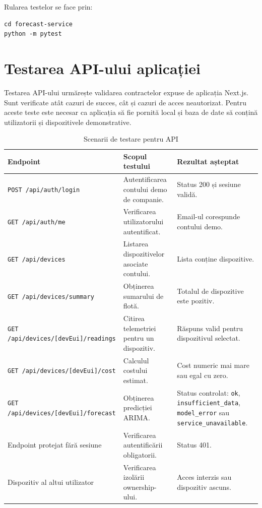 Rularea testelor se face prin:

\begin{verbatim}
cd forecast-service
python -m pytest
\end{verbatim}

\section{Testarea API-ului aplicației}

Testarea API-ului urmărește validarea contractelor expuse de aplicația Next.js. Sunt verificate atât cazuri de succes, cât și cazuri de acces neautorizat. Pentru aceste teste este necesar ca aplicația să fie pornită local și baza de date să conțină utilizatorii și dispozitivele demonstrative.

\begin{table}[htbp]
\centering
\small
\begin{tabular}{|p{}|p{}|p{}|}
\hline
\textbf{Endpoint} & \textbf{Scopul testului} & \textbf{Rezultat așteptat} \\
\hline
\texttt{POST /api/auth/login} & Autentificarea contului demo de companie. & Status 200 și sesiune validă. \\
\hline
\texttt{GET /api/auth/me} & Verificarea utilizatorului autentificat. & Email-ul corespunde contului demo. \\
\hline
\texttt{GET /api/devices} & Listarea dispozitivelor asociate contului. & Lista conține dispozitive. \\
\hline
\texttt{GET /api/devices/summary} & Obținerea sumarului de flotă. & Totalul de dispozitive este pozitiv. \\
\hline
\texttt{GET /api/devices/[devEui]/readings} & Citirea telemetriei pentru un dispozitiv. & Răspuns valid pentru dispozitivul selectat. \\
\hline
\texttt{GET /api/devices/[devEui]/cost} & Calculul costului estimat. & Cost numeric mai mare sau egal cu zero. \\
\hline
\texttt{GET /api/devices/[devEui]/forecast} & Obținerea predicției ARIMA. & Status controlat: \texttt{ok}, \texttt{insufficient\_data}, \texttt{model\_error} sau \texttt{service\_unavailable}. \\
\hline
Endpoint protejat fără sesiune & Verificarea autentificării obligatorii. & Status 401. \\
\hline
Dispozitiv al altui utilizator & Verificarea izolării ownership-ului. & Acces interzis sau dispozitiv ascuns. \\
\hline
\end{tabular}
\caption{Scenarii de testare pentru API}
\label{tab:teste-api}
\end{table}

